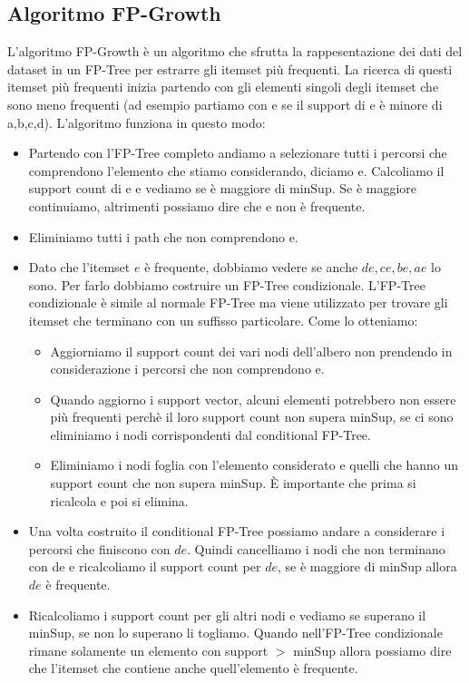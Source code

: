 \documentclass[14pt]{extreport}
\begin{document}
\subsection{Algoritmo FP-Growth}

L'algoritmo FP-Growth è un algoritmo che sfrutta la rappesentazione dei dati del dataset in un FP-Tree per estrarre gli itemset più frequenti.
La ricerca di questi itemset più frequenti inizia partendo con gli elementi singoli degli itemset che sono meno frequenti (ad esempio partiamo con e se il support di e è minore di a,b,c,d).
L'algoritmo funziona in questo modo:

\begin{itemize}
    \item Partendo con l'FP-Tree completo andiamo a selezionare tutti i percorsi che comprendono l'elemento che stiamo considerando, diciamo e. Calcoliamo il support count di e e vediamo se è maggiore di minSup. Se è maggiore continuiamo, altrimenti possiamo dire che e non è frequente.
    \item Eliminiamo tutti i path che non comprendono e.
    \item Dato che l'itemset ${e}$ è frequente, dobbiamo vedere se anche ${de,ce,be,ae}$ lo sono. Per farlo dobbiamo costruire un FP-Tree condizionale.
    L'FP-Tree condizionale è simile al normale FP-Tree ma viene utilizzato per trovare gli itemset che terminano con un suffisso particolare.
    Come lo otteniamo:
        \begin{itemize}
            \item Aggiorniamo il support count dei vari nodi dell'albero non prendendo in considerazione i percorsi che non comprendono e.
            \item Quando aggiorno i support vector, alcuni elementi potrebbero non essere più frequenti perchè il loro support count non supera minSup, se ci sono eliminiamo i nodi corrispondenti dal conditional FP-Tree.
            \item Eliminiamo i nodi foglia con l'elemento considerato e quelli che hanno un support count che non supera minSup.
            È importante che prima si ricalcola e poi si elimina.
        \end{itemize}
    \item Una volta costruito il conditional FP-Tree possiamo andare a considerare i percorsi che finiscono con ${de}$. Quindi cancelliamo i nodi che non terminano con de e ricalcoliamo il support count per ${de}$, se è maggiore di minSup allora ${de}$ è frequente.
    \item Ricalcoliamo i support count per gli altri nodi e vediamo se superano il minSup, se non lo superano li togliamo. Quando nell'FP-Tree condizionale rimane solamente un elemento con support $>$ minSup allora possiamo dire che l'itemset che contiene anche quell'elemento è frequente.
\end{itemize}
\end{document}
